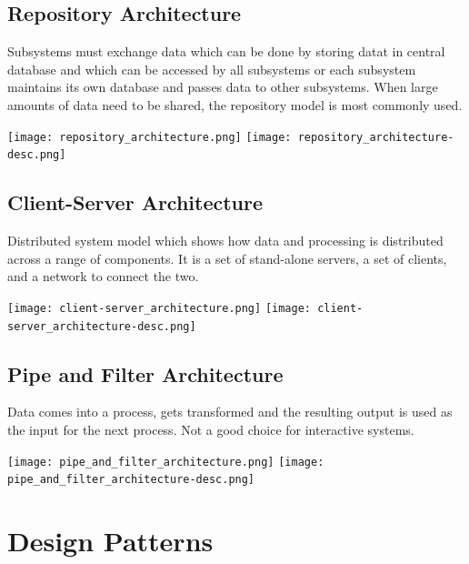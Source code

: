 \documentclass{article}
\begin{document}
    \subsection*{Repository Architecture}

    Subsystems must exchange data which can be done by storing datat in central database
    and which can be accessed by all subsystems or each subsystem maintains its own 
    database and passes data to other subsystems. When large amounts of data need to be 
    shared, the repository model is most commonly used.

    \begin{center}
        \texttt{[image: repository\_architecture.png]}
        \texttt{[image: repository\_architecture-desc.png]}
    \end{center}

    \subsection*{Client-Server Architecture}

    Distributed system model which shows how data and processing is distributed across 
    a range of components. It is a set of stand-alone servers, a set of clients, and a 
    network to connect the two.

    \begin{center}
        \texttt{[image: client-server\_architecture.png]}
        \texttt{[image: client-server\_architecture-desc.png]}
    \end{center}

    \subsection*{Pipe and Filter Architecture}

    Data comes into a process, gets transformed and the resulting output is used as the 
    input for the next process. Not a good choice for interactive systems.

    \begin{center}
        \texttt{[image: pipe\_and\_filter\_architecture.png]}
        \texttt{[image: pipe\_and\_filter\_architecture-desc.png]}
    \end{center}

    \section*{Design Patterns}
    
\end{document}
